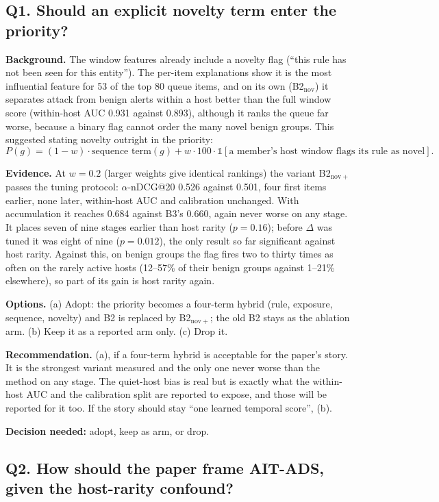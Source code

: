 \documentclass[10.5pt,a4paper]{article}
\newcommand{\rec}[1]{\par\smallskip\noindent\colorbox{gray!12}{\parbox{\dimexpr\linewidth-2\fboxsep}{\textbf{Recommendation.} #1}}\par\smallskip}
\newcommand{\ask}[1]{\par\noindent\textbf{Decision needed:} #1\par\medskip}
\newcommand{\sub}[1]{\par\smallskip\noindent\textbf{#1}\quad}
\begin{document}
\subsection*{Q1. Should an explicit novelty term enter the priority?}

\sub{Background.} The window features already include a novelty flag (``this rule has not been seen for this entity''). The per-item explanations show it is the most influential feature for 53 of the top 80 queue items, and on its own (B2$_\mathrm{nov}$) it separates attack from benign alerts within a host better than the full window score (within-host AUC 0.931 against 0.893), although it ranks the queue far worse, because a binary flag cannot order the many novel benign groups. This suggested stating novelty outright in the priority:
\[ P(g) = (1-w)\cdot\text{sequence term}(g) + w\cdot 100\cdot\mathbb{1}[\text{a member's host window flags its rule as novel}]. \]

\sub{Evidence.} At $w = 0.2$ (larger weights give identical rankings) the variant B2$_\mathrm{nov+}$ passes the tuning protocol: $\alpha$-nDCG@20 0.526 against 0.501, four first items earlier, none later, within-host AUC and calibration unchanged. With accumulation it reaches 0.684 against B3's 0.660, again never worse on any stage. It places seven of nine stages earlier than host rarity ($p = 0.16$); before $\Delta$ was tuned it was eight of nine ($p = 0.012$), the only result so far significant against host rarity. Against this, on benign groups the flag fires two to thirty times as often on the rarely active hosts (12--57\% of their benign groups against 1--21\% elsewhere), so part of its gain is host rarity again.

\sub{Options.} (a) Adopt: the priority becomes a four-term hybrid (rule, exposure, sequence, novelty) and B2 is replaced by B2$_\mathrm{nov+}$; the old B2 stays as the ablation arm. (b) Keep it as a reported arm only. (c) Drop it.

\rec{(a), if a four-term hybrid is acceptable for the paper's story. It is the strongest variant measured and the only one never worse than the method on any stage. The quiet-host bias is real but is exactly what the within-host AUC and the calibration split are reported to expose, and those will be reported for it too. If the story should stay ``one learned temporal score'', (b).}
\ask{adopt, keep as arm, or drop.}

\subsection*{Q2. How should the paper frame AIT-ADS, given the host-rarity confound?}
\end{document}
